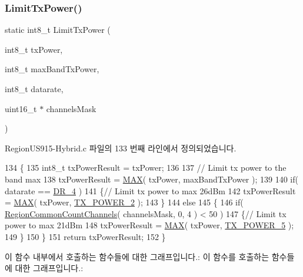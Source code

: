 \subsubsection{\texorpdfstring{Limit\+Tx\+Power()}{LimitTxPower()}}
{\footnotesize\ttfamily static int8\+\_\+t Limit\+Tx\+Power (\begin{DoxyParamCaption}\item[{int8\+\_\+t}]{tx\+Power,  }\item[{int8\+\_\+t}]{max\+Band\+Tx\+Power,  }\item[{int8\+\_\+t}]{datarate,  }\item[{uint16\+\_\+t $\ast$}]{channels\+Mask }\end{DoxyParamCaption})\hspace{0.3cm}{\ttfamily [static]}}



Region\+U\+S915-\/\+Hybrid.\+c 파일의 133 번째 라인에서 정의되었습니다.


\begin{DoxyCode}
134 \{
135     int8\_t txPowerResult = txPower;
136 
137     \textcolor{comment}{// Limit tx power to the band max}
138     txPowerResult =  \mbox{\hyperlink{utilities_8h_afa99ec4acc4ecb2dc3c2d05da15d0e3f}{MAX}}( txPower, maxBandTxPower );
139 
140     \textcolor{keywordflow}{if}( datarate == \mbox{\hyperlink{group___r_e_g_i_o_n_ga6ceba6158a7dab238e9d0b846fb47a0c}{DR\_4}} )
141     \{\textcolor{comment}{// Limit tx power to max 26dBm}
142         txPowerResult = \mbox{\hyperlink{utilities_8h_afa99ec4acc4ecb2dc3c2d05da15d0e3f}{MAX}}( txPower, \mbox{\hyperlink{group___r_e_g_i_o_n_gaf308ada92d6393ca5ae171ffc462c74c}{TX\_POWER\_2}} );
143     \}
144     \textcolor{keywordflow}{else}
145     \{
146         \textcolor{keywordflow}{if}( \mbox{\hyperlink{group___r_e_g_i_o_n_c_o_m_m_o_n_gac23f0831812f610f57f42f6cf87368c9}{RegionCommonCountChannels}}( channelsMask, 0, 4 ) < 50 )
147         \{\textcolor{comment}{// Limit tx power to max 21dBm}
148             txPowerResult = \mbox{\hyperlink{utilities_8h_afa99ec4acc4ecb2dc3c2d05da15d0e3f}{MAX}}( txPower, \mbox{\hyperlink{group___r_e_g_i_o_n_ga0149d52581db80901b5bc1adf0aedd1d}{TX\_POWER\_5}} );
149         \}
150     \}
151     \textcolor{keywordflow}{return} txPowerResult;
152 \}
\end{DoxyCode}
이 함수 내부에서 호출하는 함수들에 대한 그래프입니다.\+:
이 함수를 호출하는 함수들에 대한 그래프입니다.\+:
\mbox{\label{_region_u_s915-_hybrid_8c_ac8aa2da46dca1566e730ffda2650f947}} 
